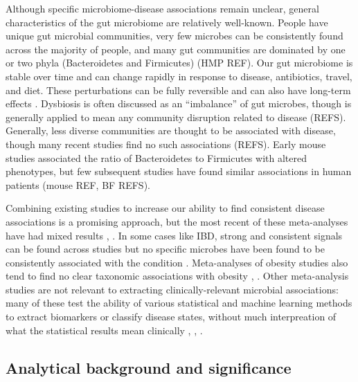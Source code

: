 \documentclass[12pt]{article}
\begin{document}
Although specific microbiome-disease associations remain unclear, general characteristics
of the gut microbiome are relatively well-known. People have unique gut microbial 
communities, very few microbes can be consistently found across the majority of people,
and many gut communities are dominated by one or two phyla (Bacteroidetes and Firmicutes) (HMP REF).
Our gut microbiome is stable over time and can change rapidly in response to 
disease, antibiotics, travel, and diet. These perturbations can be fully reversible
and can also have long-term effects \cite{david-huge-2012}.
Dysbiosis is often discussed as an ``imbalance'' of gut microbes, though
is generally applied to mean any community disruption related to disease (REFS).
Generally, less diverse communities are thought to be associated with disease,
though many recent studies find no such associations (REFS).
Early mouse studies associated the ratio of Bacteroidetes to Firmicutes with
altered phenotypes, but few subsequent studies have found similar associations
in human patients (mouse REF, BF REFS). 

Combining existing studies to increase our ability to find consistent
disease associations is a promising approach, but the most recent of these meta-analyses
have had mixed results \cite{walters-ob_meta-2014}, \cite{sze-signal-2016}. 
In some cases like IBD, strong and consistent 
signals can be found across studies but no specific microbes have 
been found to be consistently associated with the condition \cite{walters-ob_meta-2014}. Meta-analyses of obesity studies also tend 
to find no clear taxonomic associations with obesity \cite{sze-signal-2016}, \cite{walters-ob_meta-2014}. 
Other meta-analysis studies are not relevant to extracting 
clinically-relevant microbial associations: many of these test the 
ability of various statistical and machine learning methods
to extract biomarkers or classify disease states, without much
interpreation of what the statistical results mean clinically
\cite{knights-supervised-2010}, \cite{lozupone-meta-2013}, \cite{BIOMARKERS-PAPERS-the-one-in-asana}.

\subsection{Analytical background and significance}
\end{document}
